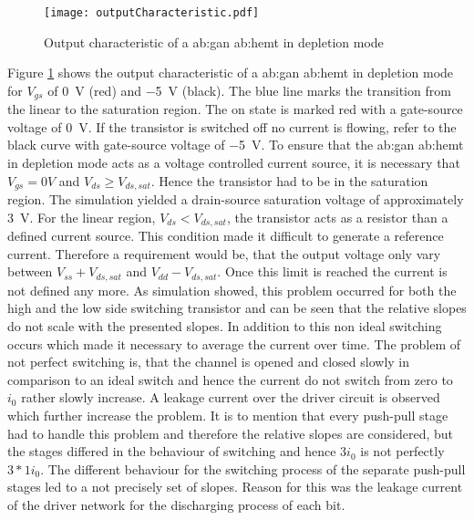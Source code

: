 \begin{figure}[ht]
	\centering
  \texttt{[image: outputCharacteristic.pdf]}
	\caption{Output characteristic of a \gls{ab:gan} \gls{ab:hemt} in depletion mode}
	\label{fig:OutputCharacteristic}
\end{figure}

Figure \ref{fig:OutputCharacteristic} shows the output characteristic of a \gls{ab:gan} \gls{ab:hemt} in depletion mode for $V_{gs}$ of \SI{0}{\volt} (red) and \SI{-5}{\volt} (black).
The blue line marks the transition from the linear to the saturation region.
The on state is marked red with a gate-source voltage of \SI{0}{\volt}.
If the transistor is switched off no current is flowing, refer to the black curve with gate-source voltage of \SI{-5}{\volt}.
To ensure that the \gls{ab:gan} \gls{ab:hemt} in depletion mode acts as a voltage controlled current source, it is necessary that $V_{gs} = 0V$ and $V_{ds} \geq V_{ds,sat}$.
Hence the transistor had to be in the saturation region.
The simulation yielded a drain-source saturation voltage of approximately \SI{3}{\volt}.
For the linear region, $V_{ds} < V_{ds,sat}$, the transistor acts as a resistor than a defined current source.
This condition made it difficult to generate a reference current.
Therefore a requirement would be, that the output voltage only vary between $V_{ss} + V_{ds,sat}$ and $V_{dd} - V_{ds,sat}$.
Once this limit is reached the current is not defined any more.
As simulation showed, this problem occurred for both the high and the low side switching transistor and can be seen that the relative slopes do not scale with the presented slopes.
In addition to this non ideal switching occurs which made it necessary to average the current over time.
The problem of not perfect switching is, that the channel is opened and closed slowly in comparison to an ideal switch and hence the current do not switch from zero to $i_0$ rather slowly increase.
A leakage current over the driver circuit is observed which further increase the problem.
It is to mention that every push-pull stage had to handle this problem and therefore the relative slopes are considered, but the stages differed in the behaviour of switching and hence $3 i_0$ is not perfectly $3 * 1 i_0$.
The different behaviour for the switching process of the separate push-pull stages led to a not precisely set of slopes. 
Reason for this was the leakage current of the driver network for the discharging process of each bit.


